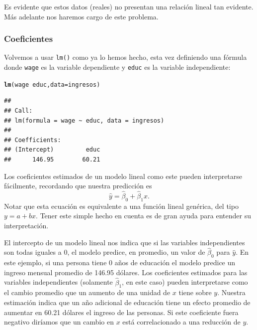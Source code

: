 \documentclass{report}\usepackage[]{graphicx}\usepackage[]{color}
\makeatletter
\newcommand{\hlopt}[1]{\textcolor[rgb]{0,0,0}{#1}}%
\newcommand{\hlstd}[1]{\textcolor[rgb]{0.345,0.345,0.345}{#1}}%
\newcommand{\hlkwc}[1]{\textcolor[rgb]{0.333,0.667,0.333}{#1}}%
\newcommand{\hlkwd}[1]{\textcolor[rgb]{0.737,0.353,0.396}{\textbf{#1}}}%
\newenvironment{kframe}{%
 \def\at@end@of@kframe{}%
 \ifinner\ifhmode%
  \def\at@end@of@kframe{\end{minipage}}%
  \begin{minipage}{\columnwidth}%
 \fi\fi%
 \def\FrameCommand##1{\hskip\@totalleftmargin \hskip-\fboxsep
 \colorbox{shadecolor}{##1}\hskip-\fboxsep
     \hskip-\linewidth \hskip-\@totalleftmargin \hskip\columnwidth}%
 \MakeFramed {\advance\hsize-\width
   \@totalleftmargin\z@ \linewidth\hsize
   \@setminipage}}%
 {\par\unskip\endMakeFramed%
 \at@end@of@kframe}
\newenvironment{knitrout}{}{} %
\makeatother
\begin{document}
Es evidente que estos datos (reales) no presentan una relación lineal tan evidente. Más adelante nos haremos cargo de este problema.

\subsubsection{Coeficientes}

Volvemos a usar \verb|lm()| como ya lo hemos hecho, esta vez definiendo una fórmula donde \verb|wage| es la variable dependiente y \verb|educ| es la variable independiente:
\begin{knitrout}
\color{fgcolor}\begin{kframe}
\begin{alltt}
\hlkwd{lm}\hlstd{(wage} \hlopt{~} \hlstd{educ,} \hlkwc{data} \hlstd{= ingresos)}
\end{alltt}
\begin{verbatim}
## 
## Call:
## lm(formula = wage ~ educ, data = ingresos)
## 
## Coefficients:
## (Intercept)         educ  
##      146.95        60.21
\end{verbatim}
\end{kframe}
\end{knitrout}


Los coeficientes estimados de un modelo lineal como este pueden interpretarse fácilmente, recordando que nuestra predicción es
\begin{equation*}
\hat y = \hat \beta_0 + \hat \beta_1 x.
\end{equation*}
Notar que esta ecuación es equivalente a una función lineal genérica, del tipo $y=a+bx$. Tener este simple hecho en cuenta es de gran ayuda para entender su interpretación.

El intercepto de un modelo lineal nos indica que si las variables independientes son todas iguales a 0, el modelo predice, en promedio, un valor de $\hat \beta_0$ para $\hat y$. En este ejemplo, si una persona tiene 0 años de educación el modelo predice un ingreso mensual promedio de 146.95 dólares.
Los coeficientes estimados para las variables independientes (solamente $\hat \beta_1$, en este caso) pueden interpretarse como el cambio promedio que un aumento de una unidad de $x$ tiene sobre $y$. Nuestra estimación indica que un año adicional de educación tiene un efecto promedio de aumentar en 60.21 dólares el ingreso de las personas. Si este coeficiente fuera negativo diríamos que un cambio en $x$ está correlacionado a una reducción de $y$.
\end{document}
